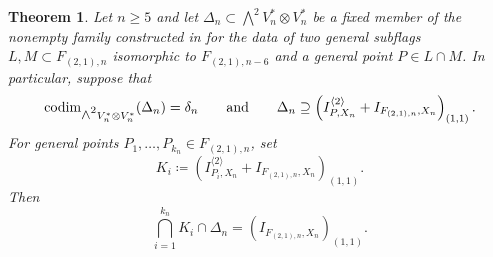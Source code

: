 \documentclass[a4paper,reqno]{amsart}
\theoremstyle{plainnopunct}
\newtheorem{theorem}{Theorem}[section]
\theoremstyle{definitionnopunct}
\newcommand{\superwedge}{\mathlarger{\mathlarger{\wedge}}}
\newcommand{\codim}{\operatorname{codim}}
\begin{document}
\begin{theorem}
\label{goodpost}
Let $n\geq5$ and let $\Delta_n\subset\bigwedge^2V_n^*\otimes V_n^*$ be a fixed member of the nonempty family constructed in  for the data of two general subflags $L,M\subset F_{(2,1),n}$ isomorphic to $F_{(2,1),n-6}$ and a general point $P\in L\cap M$. In particular, suppose that
\[
\codim_{\superwedge^2V_n^*\otimes V_n^*}(\Delta_n)
=
\delta_n
\qquad
\text{and}
\qquad
\Delta_n
\supseteq
\left(
I_{P,X_n}^{\langle2\rangle}
+
I_{F_{(2,1),n},X_n}
\right)_{(1,1)}.
\]
For general points
$P_1,\ldots,P_{k_n}
\in
F_{(2,1),n}$,
set
\[
K_i
\coloneq
\left(
I_{P_i,X_n}^{\langle2\rangle}
+
I_{F_{(2,1),n},X_n}
\right)_{(1,1)}.
\]
Then
\[
\bigcap_{i=1}^{k_n}K_i
\cap
\Delta_n
=
\left(
I_{F_{(2,1),n},X_n}
\right)_{(1,1)}.
\]
\end{theorem}
\end{document}

